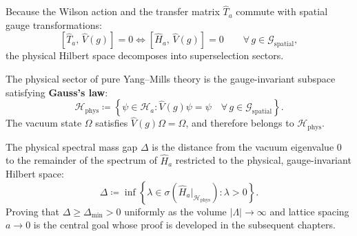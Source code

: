 Because the Wilson action and the transfer matrix $\hat{T}_a$ commute with spatial gauge transformations:
\begin{equation}
\left[ \hat{T}_a, \, \hat{V}(g) \right] = 0 \iff \left[ \hat{H}_a, \, \hat{V}(g) \right] = 0 \qquad \forall \, g \in \mathcal{G}_{\mathrm{spatial}},
\end{equation}
the physical Hilbert space decomposes into superselection sectors.

The physical sector of pure Yang--Mills theory is the gauge-invariant subspace satisfying \textbf{Gauss's law}:
\begin{equation}
\label{eq:gauss_law_subspace}
\mathcal{H}_{\mathrm{phys}} \coloneqq \left\{ \psi \in \mathcal{H}_a : \hat{V}(g) \psi = \psi \quad \forall \, g \in \mathcal{G}_{\mathrm{spatial}} \right\}.
\end{equation}
The vacuum state $\Omega$ satisfies $\hat{V}(g) \Omega = \Omega$, and therefore belongs to $\mathcal{H}_{\mathrm{phys}}$. 

The physical spectral mass gap $\Delta$ is the distance from the vacuum eigenvalue 0 to the remainder of the spectrum of $\hat{H}_a$ restricted to the physical, gauge-invariant Hilbert space:
\begin{equation}
\label{eq:mass_gap_spec_def_ch2}
\Delta \coloneqq \inf \left\{ \lambda \in \sigma(\hat{H}_a|_{\mathcal{H}_{\mathrm{phys}}}) : \lambda > 0 \right\}.
\end{equation}
Proving that $\Delta \ge \Delta_{\min} > 0$ uniformly as the volume $|\Lambda| \to \infty$ and lattice spacing $a \to 0$ is the central goal whose proof is developed in the subsequent chapters.
